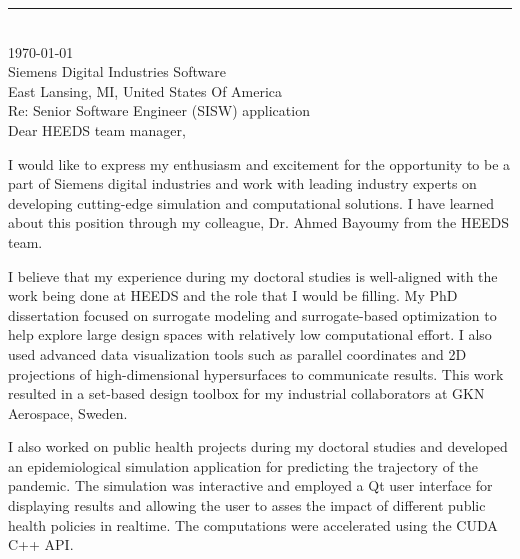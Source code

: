 \documentclass[12pt]{article} %
\begin{document}
\medskip %
\rule[0pt]{\textwidth}{1pt}\\
\today\\[6pt]
Siemens Digital Industries Software\\
East Lansing, MI, United States Of America\\
Re: Senior Software Engineer (SISW) application\\[6pt] \medskip
Dear HEEDS team manager,

\medskip %
I would like to express my enthusiasm and excitement for the opportunity to be a part of Siemens digital industries and work with leading industry experts on developing cutting-edge simulation and computational solutions. I have learned about this position through my colleague, Dr. Ahmed Bayoumy from the HEEDS team.

\medskip %

I believe that my experience during my doctoral studies is well-aligned with the work being done at HEEDS and the role that I would be filling. My PhD dissertation focused on surrogate modeling and surrogate-based optimization to help explore large design spaces with relatively low computational effort. I also used advanced data visualization tools such as parallel coordinates and 2D projections of high-dimensional hypersurfaces to communicate results. This work resulted in a set-based design toolbox for my industrial collaborators at GKN Aerospace, Sweden. 

\medskip %

I also worked on public health projects during my doctoral studies and developed an epidemiological simulation application for predicting the trajectory of the pandemic. The simulation was interactive and employed a Qt user interface for displaying results and allowing the user to asses the impact of different public health policies in realtime. The computations were accelerated using the CUDA C++ API.

\medskip %
\end{document}
